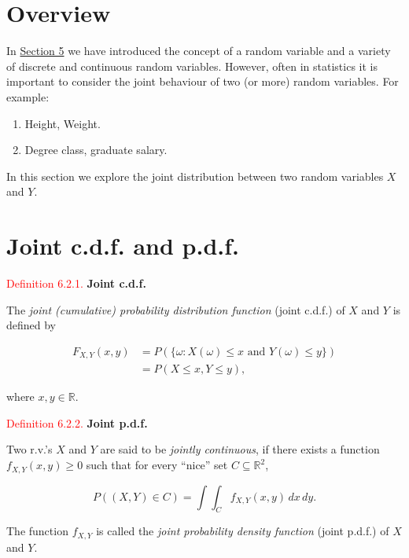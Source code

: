 \documentclass[
]{book}
\providecommand{\tightlist}{%
  \setlength{\itemsep}{0pt}\setlength{\parskip}{0pt}}
\begin{document}
\hypertarget{jointdis:intro}{%
\section{Overview}\label{jointdis:intro}}

In \protect\hyperlink{rv}{Section 5} we have introduced the concept of a random variable and a variety of discrete and continuous random variables. However, often in statistics it is important to consider the joint
behaviour of two (or more) random variables. For example:

\begin{enumerate}
\def\labelenumi{(\roman{enumi})}
\tightlist
\item
  Height, Weight.\\
\item
  Degree class, graduate salary.
\end{enumerate}

In this section we explore the joint distribution between two random variables \(X\) and \(Y\).

\hypertarget{jointdis:cdf}{%
\section{Joint c.d.f. and p.d.f.}\label{jointdis:cdf}}

\leavevmode{}%
\textcolor{red}{Definition 6.2.1.}
{\textbf{Joint c.d.f.}}

The \emph{joint (cumulative) probability distribution function} (joint c.d.f.) of \(X\) and \(Y\) is defined by

\begin{align*}
F_{X,Y}(x,y) &= P( \{ \omega: X(\omega) \leq x \text{ and } Y(\omega) \leq y \} )\\
&= P (X \leq x, Y \leq y),
\end{align*}

where \(x,y \in \mathbb{R}\).

\leavevmode{}%
\textcolor{red}{Definition 6.2.2.}
{\textbf{Joint p.d.f.}}

Two r.v.'s \(X\) and \(Y\) are said to be \emph{jointly continuous}, if there exists a function \(f_{X,Y}(x,y) \geq 0\) such that for every ``nice'' set \(C \subseteq {\mathbb R}^2\),

\[P( (X,Y) \in C) = \int\int_C f_{X,Y}(x,y) \,dx \,dy.\]

The function \(f_{X,Y}\) is called the \emph{joint probability density function} (joint p.d.f.) of \(X\) and \(Y\).
\end{document}
